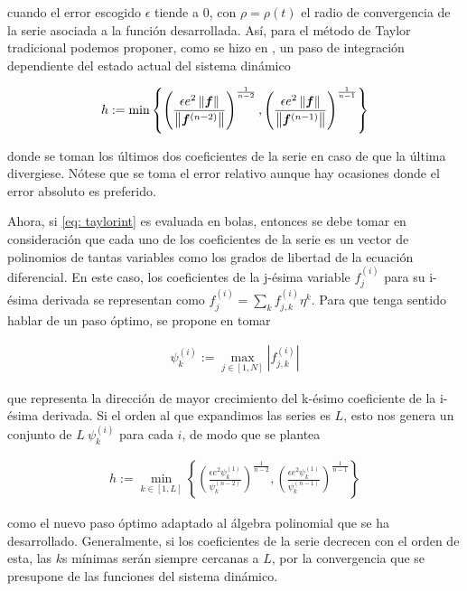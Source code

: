 cuando el error escogido $\epsilon$ tiende a $0$, con $\rho = \rho(t)$ el radio de convergencia de la serie asociada a la función desarrollada. Así, para el método de Taylor tradicional podemos proponer, como se hizo en \cite{Perez2015}, un paso de integración dependiente del estado actual del sistema dinámico

\begin{align}
 h := \min{ \left\lbrace \left(\frac{ \epsilon e^2 \left\lVert\bm{f}\right\rVert }{ \left\lVert\bm{f}^{(n-2)}\right\rVert}\right)^{  \frac{1}{n-2} } , \left(\frac{ \epsilon e^2 \left\lVert\bm{f}\right\rVert}{ \left\lVert\bm{f}^{(n-1)}\right\rVert}\right)^{ \frac{1}{n-1} }  \right\rbrace }
\end{align}

donde se toman los últimos dos coeficientes de la serie en caso de que la última divergiese. Nótese que se toma el error relativo aunque hay ocasiones donde el error absoluto es preferido.

Ahora, si \ref{eq: taylorint} es evaluada en bolas, entonces se debe tomar en consideración que cada uno de los coeficientes  de la serie es un vector de polinomios de tantas variables como los grados de libertad de la ecuación diferencial. En este caso, los coeficientes de la j-ésima variable $f_j^(i)$ para su i-ésima derivada se representan como $f_j^{(i)} = \sum_k f_{j,k}^{(i)} \eta^k$. Para que tenga sentido hablar de un paso óptimo, se propone en \cite{Perez2015} tomar 

\begin{align*}
 \psi_k^{(i)} := \max_{j \in [1,N]}{|f_{j,k}^{(i)}|}
\end{align*}

que representa la dirección de mayor crecimiento del k-ésimo coeficiente de la i-ésima derivada. Si el orden al que expandimos las series es $L$, esto nos genera un conjunto de $L \ \psi_k^{(i)}$  para cada $i$, de modo que se plantea 

\begin{align*}
 h := \min_{k \in [1,L]}{ \left\lbrace \left(\frac{ \epsilon e^2 \psi_k^{(1)} }{ \psi_k^{(n-2)}}\right)^{  \frac{1}{n-2} } , \left(\frac{ \epsilon e^2 \psi_k^{(1)}}{ \psi_k^{(n-1)}}\right)^{ \frac{1}{n-1} }  \right\rbrace }
\end{align*}

como el nuevo paso óptimo adaptado al álgebra polinomial que se ha desarrollado. Generalmente, si los coeficientes de la serie decrecen con el orden de esta, las $k$s mínimas serán siempre cercanas a $L$, por la convergencia que se presupone de las funciones del sistema dinámico.

